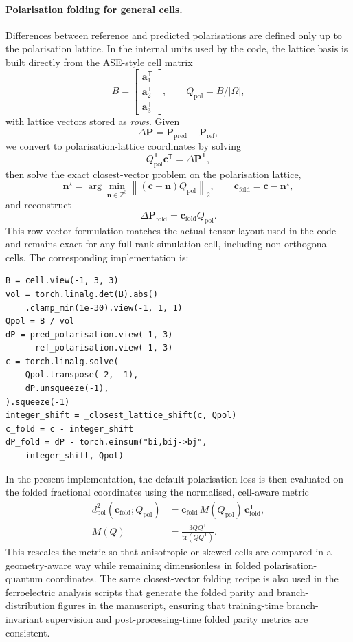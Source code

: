 \documentclass[aps,physrev,graphicx,amsmath,amssymb,reprint]{revtex4-2} %
\begin{document}
\paragraph*{Polarisation folding for general cells.}
Differences between reference and predicted polarisations are defined only up to the polarisation lattice. In the internal units used by the code, the lattice basis is built directly from the ASE-style cell matrix
\[
B=
\begin{bmatrix}
\mathbf a_1^\mathsf{T}\\
\mathbf a_2^\mathsf{T}\\
\mathbf a_3^\mathsf{T}
\end{bmatrix},
\qquad
Q_{\mathrm{pol}} = B / |\Omega|,
\]
with lattice vectors stored as \emph{rows}. Given
\[
\Delta \mathbf P = \mathbf P_{\mathrm{pred}}-\mathbf P_{\mathrm{ref}},
\]
we convert to polarisation-lattice coordinates by solving
\[
Q_{\mathrm{pol}}^\mathsf{T}\mathbf c^\mathsf{T}=\Delta\mathbf P^\mathsf{T},
\]
then solve the exact closest-vector problem on the polarisation lattice,
\[
\mathbf n^\star=\arg\min_{\mathbf n\in\mathbb Z^3}\left\|(\mathbf c-\mathbf n)Q_{\mathrm{pol}}\right\|_2,
\qquad
\mathbf c_{\mathrm{fold}}=\mathbf c-\mathbf n^\star,
\]
and reconstruct
\[
\Delta\mathbf P_{\mathrm{fold}}=\mathbf c_{\mathrm{fold}}Q_{\mathrm{pol}}.
\]
This row-vector formulation matches the actual tensor layout used in the code and remains exact for any full-rank simulation cell, including non-orthogonal cells. The corresponding implementation is:
\begin{verbatim}
B = cell.view(-1, 3, 3)
vol = torch.linalg.det(B).abs()
    .clamp_min(1e-30).view(-1, 1, 1)
Qpol = B / vol
dP = pred_polarisation.view(-1, 3) 
    - ref_polarisation.view(-1, 3)
c = torch.linalg.solve(
    Qpol.transpose(-2, -1),
    dP.unsqueeze(-1),
).squeeze(-1)
integer_shift = _closest_lattice_shift(c, Qpol)
c_fold = c - integer_shift
dP_fold = dP - torch.einsum("bi,bij->bj", 
    integer_shift, Qpol)
\end{verbatim}
In the present implementation, the default polarisation loss is then evaluated on the folded fractional coordinates using the normalised, cell-aware metric
\begin{equation}
\begin{aligned}
    d_{\mathrm{pol}}^2(\mathbf c_{\mathrm{fold}};Q_{\mathrm{pol}})
    &=
    \mathbf c_{\mathrm{fold}}\,M(Q_{\mathrm{pol}})\,\mathbf c_{\mathrm{fold}}^\mathsf{T},
    \\
    M(Q)&=\frac{3QQ^\mathsf{T}}{\mathrm{tr}(QQ^\mathsf{T})}.
\end{aligned}    
\end{equation}
This rescales the metric so that anisotropic or skewed cells are compared in a geometry-aware way while remaining dimensionless in folded polarisation-quantum coordinates. The same closest-vector folding recipe is also used in the ferroelectric analysis scripts that generate the folded parity and branch-distribution figures in the manuscript, ensuring that training-time branch-invariant supervision and post-processing-time folded parity metrics are consistent.
\end{document}
